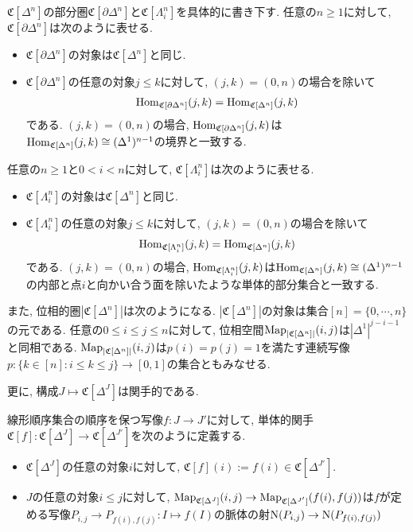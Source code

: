 \documentclass[uplatex, a4paper, 14Q, dvipdfmx]{jsreport}
\begin{document}
$\mathfrak{C}[\Delta^n]$の部分圏$\mathfrak{C}[\partial \Delta^n]$と$\mathfrak{C}[\Lambda^n_i]$を具体的に書き下す. 
任意の$n \geq 1$に対して, $\mathfrak{C}[\partial \Delta^n]$は次のように表せる. 
\begin{itemize}
  \item $\mathfrak{C}[\partial \Delta^n]$の対象は$\mathfrak{C}[\Delta^n]$と同じ.
  \item $\mathfrak{C}[\partial \Delta^n]$の任意の対象$j \leq k$に対して, $(j,k)=(0,n)$の場合を除いて
  \begin{align*}
    \mathrm{Hom}_{\mathfrak{C}[\partial \Delta^n]}(j,k) = \mathrm{Hom}_{\mathfrak{C}[\Delta^n]}(j,k)
  \end{align*}
  である. 
  $(j,k)=(0,n)$の場合, $\mathrm{Hom}_{\mathfrak{C}[\partial \Delta^n]}(j,k)$は$\mathrm{Hom}_{\mathfrak{C}[\Delta^n]}(j,k) \cong (\Delta^1)^{n-1}$の境界と一致する.
\end{itemize}
任意の$n \geq 1$と$0<i<n$に対して, $\mathfrak{C}[\Lambda^n_i]$は次のように表せる. 
\begin{itemize}
  \item $\mathfrak{C}[\Lambda^n_i]$の対象は$\mathfrak{C}[\Delta^n]$と同じ.
  \item $\mathfrak{C}[\Lambda^n_i]$の任意の対象$j \leq k$に対して, $(j,k)=(0,n)$の場合を除いて
  \begin{align*}
    \mathrm{Hom}_{\mathfrak{C}[\Lambda^n_i]}(j,k) = \mathrm{Hom}_{\mathfrak{C}[\Delta^n]}(j,k)
  \end{align*}
  である. 
  $(j,k)=(0,n)$の場合, $\mathrm{Hom}_{\mathfrak{C}[\Lambda^n_i]}(j,k)$は$\mathrm{Hom}_{\mathfrak{C}[\Delta^n]}(j,k) \cong (\Delta^1)^{n-1}$の内部と点$i$と向かい合う面を除いたような単体的部分集合と一致する. 
\end{itemize}
また, 位相的圏$|\mathfrak{C}[\Delta^n]|$は次のようになる.  
$|\mathfrak{C}[\Delta^n]|$の対象は集合$[n] = \{0,\cdots,n\}$の元である. 
任意の$0 \leq i \leq j \leq n$に対して, 位相空間$\mathrm{Map}_{|\mathfrak{C}[\Delta^n]|}(i,j)$は$|\Delta^1|^{j-i-1}$と同相である. 
$\mathrm{Map}_{|\mathfrak{C}[\Delta^n]|}(i,j)$は$p(i)=p(j)=1$を満たす連続写像$p : \{k \in [n] : i \leq k \leq j\} \to [0,1]$の集合ともみなせる. 

更に, 構成$J \mapsto \mathfrak{C}[\Delta^J]$は関手的である. 

\begin{definition} \label{def.1.1.5.3}
  線形順序集合の順序を保つ写像$f : J \to J'$に対して, 単体的関手$\mathfrak{C}[f] : \mathfrak{C}[\Delta^J] \to \mathfrak{C}[\Delta^{J'}]$を次のように定義する. 
  \begin{itemize}
    \item $\mathfrak{C}[\Delta^J]$の任意の対象$i$に対して, $\mathfrak{C}[f](i) := f(i) \in \mathfrak{C}[\Delta^{J'}]$.
    \item $J$の任意の対象$i \leq j$に対して, $\mathrm{Map}_{\mathfrak{C}[\Delta^J]}(i,j) \to \mathrm{Map}_{\mathfrak{C}[\Delta^{J'}]}(f(i),f(j))$は$f$が定める写像$P_{i,j} \to P_{f(i),f(j)} : I \mapsto f(I)$の脈体の射$\mathrm{N}(P_{i,j}) \to \mathrm{N}(P_{f(i),f(j)})$
  \end{itemize}
\end{definition}
\end{document}
